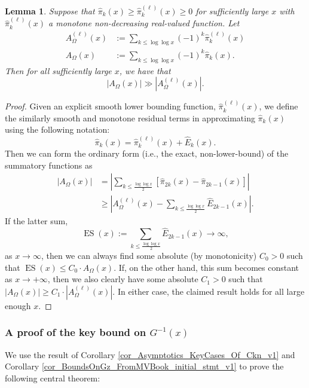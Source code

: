 \documentclass[11pt,reqno,a4letter]{article}
\numberwithin{figure}{section}
\numberwithin{table}{section}
\theoremstyle{plain}
\newtheorem{lemma}[theorem]{Lemma}
\numberwithin{theorem}{section}
\theoremstyle{definition}
\begin{document}
\begin{lemma} 
\label{lemma_lowerBoundsOnLambdaFuncParitySummFuncs} 
Suppose that $\widehat{\pi}_k(x) \geq \widehat{\pi}_k^{(\ell)}(x) \geq 0$ for sufficiently large $x$ 
with $\widehat{\pi}_k^{(\ell)}(x)$ a monotone non-decreasing real-valued function. 
Let 
\begin{align*} 
A_{\Omega}^{(\ell)}(x) & := \sum_{k \leq \log\log x} (-1)^k \widehat{\pi}_k^{(\ell)}(x) \\ 
A_{\Omega}(x) & := \sum_{k \leq \log\log x} (-1)^k \widehat{\pi}_k(x). 
\end{align*} 
Then for all sufficiently large $x$, we have that 
$$|A_{\Omega}(x)| \gg |A_{\Omega}^{(\ell)}(x)|.$$ 
\end{lemma} 
\begin{proof} 
Given an explicit smooth lower bounding function, $\widehat{\pi}_k^{(\ell)}(x)$, we define the 
similarly smooth and monotone residual terms in approximating $\widehat{\pi}_k(x)$ 
using the following notation: 
\[
\widehat{\pi}_k(x) = \widehat{\pi}_k^{(\ell)}(x) + \widehat{E}_k(x). 
\]
Then we can form the ordinary form (i.e., the exact, non-lower-bound) of the summatory functions as 
\begin{align*} 
|A_{\Omega}(x)| & = \left\lvert \sum_{k \leq \frac{\log\log x}{2}} 
     \left[\widehat{\pi}_{2k}(x) - \widehat{\pi}_{2k-1}(x)\right] \right\rvert \\ 
     & \geq \left\lvert A_{\Omega}^{(\ell)}(x) - \sum_{k \leq \frac{\log\log x}{2}} \widehat{E}_{2k-1}(x) 
     \right\rvert. 
\end{align*} 
If the latter sum, $$\operatorname{ES}(x) := \sum_{k \leq \frac{\log\log x}{2}} \widehat{E}_{2k-1}(x) \rightarrow \infty,$$ as 
$x \rightarrow \infty$, then we can always find some absolute (by monotonicity) $C_0 > 0$ such that 
$\operatorname{ES}(x) \leq C_0 \cdot A_{\Omega}(x)$. If, on the other hand, this sum becomes constant as 
$x \rightarrow +\infty$, then we also clearly have some absolute $C_1 > 0$ such that 
$|A_{\Omega}(x)| \geq C_1 \cdot |A_{\Omega}^{(\ell)}(x)|$. 
In either case, the claimed result holds for all large enough $x$. 
\end{proof} 

\subsubsection{A proof of the key bound on $G^{-1}(x)$} 

We use the result of 
Corollary \ref{cor_Asymptotics_KeyCases_Of_Ckn_v1} and 
Corollary \ref{cor_BoundsOnGz_FromMVBook_initial_stmt_v1} 
to prove the following central theorem: 
\end{document}
